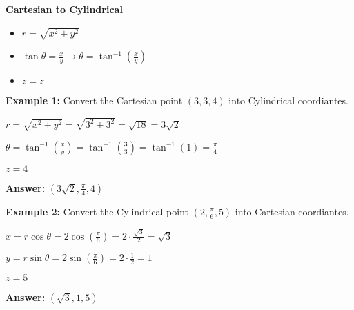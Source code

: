 \documentclass[10pt]{article}                               %
\begin{document}
\begin{defaultbox}
\begin{adjustwidth}{2em}{0pt}
\begin{adjustwidth}{2em}{0pt}
            \textbf{Cartesian to Cylindrical}

            \begin{itemize}
                \item \( r = \sqrt{x^2 + y^2} \)
                \item \( \tan\theta = \frac{x}{y}  \rightarrow  \theta = \tan^{-1}\left(\frac{x}{y}\right) \)
                \item \( z = z \)
            \end{itemize}

            \begin{examplebox}
            
                \textbf{Example 1:} Convert the Cartesian point \( \left(3,3,4\right) \) into Cylindrical coordiantes.
                \vspace{0.5em}

                \begin{adjustwidth}{2em}{0pt}

                    \( r = \sqrt{x^2 + y^2} = \sqrt{3^2 + 3^2} = \sqrt{18} = 3\sqrt{2} \)

                    \( \theta = \tan^{-1}\left(\frac{x}{y}\right) = \tan^{-1}\left(\frac{3}{3}\right) = \tan^{-1}(1) = \frac{\pi}{4} \)

                    \( z = 4 \)

                    \textbf{Answer:} \( \left(3\sqrt{2}, \frac{\pi}{4}, 4\right) \)

                \end{adjustwidth}

                \vspace{1em}

                \textbf{Example 2:} Convert the Cylindrical point \( \left(2, \frac{\pi}{6}, 5\right) \) into Cartesian coordiantes.
                \vspace{0.5em}

                \begin{adjustwidth}{2em}{0pt}

                    \( x = r\cos\theta = 2\cos\left(\frac{\pi}{6}\right) = 2 \cdot \frac{\sqrt{3}}{2} = \sqrt{3} \)

                    \( y = r\sin\theta = 2\sin\left(\frac{\pi}{6}\right) = 2 \cdot \frac{1}{2} = 1 \)

                    \( z = 5 \)

                    \textbf{Answer:} \( \left(\sqrt{3}, 1, 5\right) \)


\end{adjustwidth}
\end{examplebox}
\end{adjustwidth}
\end{adjustwidth}
\end{defaultbox}
\end{document}
